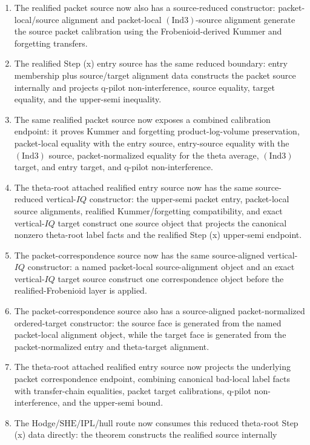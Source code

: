 \documentclass[11pt]{article}
\newcommand{\Ind}{\ensuremath{\mathrm{Ind}}}
\newcommand{\SHE}{\ensuremath{\mathrm{SHE}}}
\newcommand{\IPL}{\ensuremath{\mathrm{IPL}}}
\theoremstyle{plain}
\theoremstyle{definition}
\theoremstyle{remark}
\begin{document}
\begin{enumerate}
\item The realified packet source now also has a source-reduced constructor:
  packet-local/source alignment and packet-local \((\Ind3)\)-source alignment
  generate the source packet calibration using the Frobenioid-derived Kummer
  and forgetting transfers.
\item The realified Step (x) entry source has the same reduced boundary:
  entry membership plus source/target alignment data constructs the packet
  source internally and projects q-pilot non-interference, source equality,
  target equality, and the upper-semi inequality.
\item The same realified packet source now exposes a combined calibration
  endpoint: it proves Kummer and forgetting product-log-volume preservation,
  packet-local equality with the entry source, entry-source equality with the
  \((\Ind3)\) source, packet-normalized equality for the theta average,
  \((\Ind3)\) target, and entry target, and q-pilot non-interference.
\item The theta-root attached realified entry source now has the same
  source-reduced vertical-\(IQ\) constructor: the upper-semi packet entry,
  packet-local source alignments, realified Kummer/forgetting compatibility,
  and exact vertical-\(IQ\) target construct one source object that projects
  the canonical nonzero theta-root label facts and the realified Step (x)
  upper-semi endpoint.
\item The packet-correspondence source now has the same source-aligned
  vertical-\(IQ\) constructor: a named packet-local source-alignment object and
  an exact vertical-\(IQ\) target source construct one correspondence object
  before the realified-Frobenioid layer is applied.
\item The packet-correspondence source also has a source-aligned
  packet-normalized ordered-target constructor: the source face is generated
  from the named packet-local alignment object, while the target face is
  generated from the packet-normalized entry and theta-target alignment.
\item The theta-root attached realified entry source now projects the
  underlying packet correspondence endpoint, combining canonical bad-local
  label facts with transfer-chain equalities, packet target calibrations,
  q-pilot non-interference, and the upper-semi bound.
\item The Hodge/\(\SHE/\IPL\)/hull route now consumes this reduced theta-root
  Step (x) data directly: the theorem constructs the realified source internally

\end{enumerate}
\end{document}
